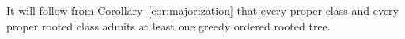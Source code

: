 \documentclass[11 pt]{modarticle}
\newcommand{\size}[1]{|#1|}
\newcommand{\ldtodo}[1]{\textcolor{blue}{{\footnotesize [TODO Loïc]} #1}}
\begin{document}
It will follow from Corollary~\ref{cor:majorization} that every proper class and every proper rooted class admits at least one greedy ordered rooted tree.

\end{document}
